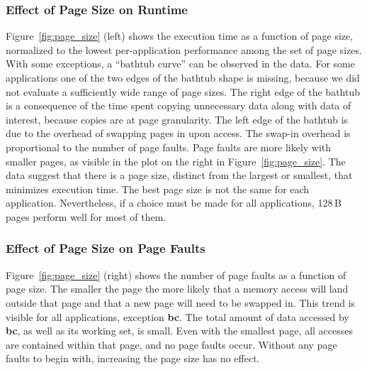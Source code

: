 \subsubsection{Effect of Page Size on Runtime}

Figure~\ref{fig:page_size} (left) shows the execution time as a function
of page size, normalized to the lowest per-application performance among the
set of page sizes.
%
With some exceptions, a ``bathtub curve'' can be observed in the data.  For
some applications one of the two edges of the bathtub shape is missing, because
we did not evaluate a sufficiently wide range of page sizes.
%
The right edge of the bathtub is a consequence of the time spent copying
unnecessary data along with data of interest, because copies are at page
granularity.
%
The left edge of the bathtub is due to the overhead of swapping pages in
upon access.
%
The swap-in overhead is proportional to the number of page faults.
%
Page faults are more likely with smaller pages, as visible in the plot on the
right in Figure~\ref{fig:page_size}.
%
The data suggest that there is a page size, distinct from the largest or
smallest, that minimizes execution time. The best page size is not the same for
each application. Nevertheless, if a choice must be made for all applications,
128\,B pages perform well for most of them.


\subsubsection{Effect of Page Size on Page Faults}

Figure~\ref{fig:page_size} (right) shows the number of page faults as a
function of page size.
%
The smaller the page the more likely that a memory access will land
outside that page and that a new page will need to be swapped in.
%
This trend is visible for all applications, exception \textbf{bc}. The total
amount of data accessed by \textbf{bc}, as well as its working set, is small.
Even with the smallest page, all accesses are contained within that page, and
no page faults occur. Without any page faults to begin with, increasing the
page size has no effect.

